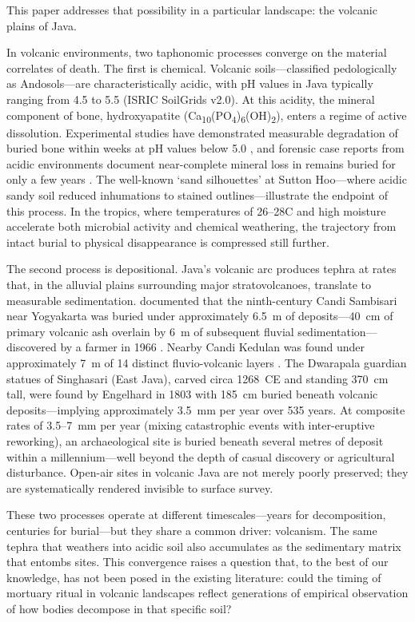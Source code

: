 \documentclass[12pt,a4paper]{article}
\begin{document}
This paper addresses that possibility in a particular landscape: the volcanic plains of Java.

In volcanic environments, two taphonomic processes converge on the material correlates of death. The first is chemical. Volcanic soils---classified pedologically as Andosols---are characteristically acidic, with pH values in Java typically ranging from 4.5 to 5.5 (ISRIC SoilGrids v2.0). At this acidity, the mineral component of bone, hydroxyapatite (Ca\textsubscript{10}(PO\textsubscript{4})\textsubscript{6}(OH)\textsubscript{2}), enters a regime of active dissolution. Experimental studies have demonstrated measurable degradation of buried bone within weeks at pH values below 5.0 \citep{oghenemavwe_2022}, and forensic case reports from acidic environments document near-complete mineral loss in remains buried for only a few years \citep{kemp_2016}. The well-known `sand silhouettes' at Sutton Hoo---where acidic sandy soil reduced inhumations to stained outlines---illustrate the endpoint of this process. In the tropics, where temperatures of 26--28\textdegree C and high moisture accelerate both microbial activity and chemical weathering, the trajectory from intact burial to physical disappearance is compressed still further.

The second process is depositional. Java's volcanic arc produces tephra at rates that, in the alluvial plains surrounding major stratovolcanoes, translate to measurable sedimentation. \citet{newhall_2000} documented that the ninth-century Candi Sambisari near Yogyakarta was buried under approximately 6.5~m of deposits---40~cm of primary volcanic ash overlain by 6~m of subsequent fluvial sedimentation---discovered by a farmer in 1966 \citep{newhall_2000}. Nearby Candi Kedulan was found under approximately 7~m of 14 distinct fluvio-volcanic layers \citep{newhall_2000}. The Dwarapala guardian statues of Singhasari (East Java), carved circa 1268~CE and standing 370~cm tall, were found by Engelhard in 1803 with 185~cm buried beneath volcanic deposits---implying approximately 3.5~mm per year over 535 years. At composite rates of 3.5--7~mm per year (mixing catastrophic events with inter-eruptive reworking), an archaeological site is buried beneath several metres of deposit within a millennium---well beyond the depth of casual discovery or agricultural disturbance. Open-air sites in volcanic Java are not merely poorly preserved; they are systematically rendered invisible to surface survey.

These two processes operate at different timescales---years for decomposition, centuries for burial---but they share a common driver: volcanism. The same tephra that weathers into acidic soil also accumulates as the sedimentary matrix that entombs sites. This convergence raises a question that, to the best of our knowledge, has not been posed in the existing literature: could the timing of mortuary ritual in volcanic landscapes reflect generations of empirical observation of how bodies decompose in that specific soil?
\end{document}
